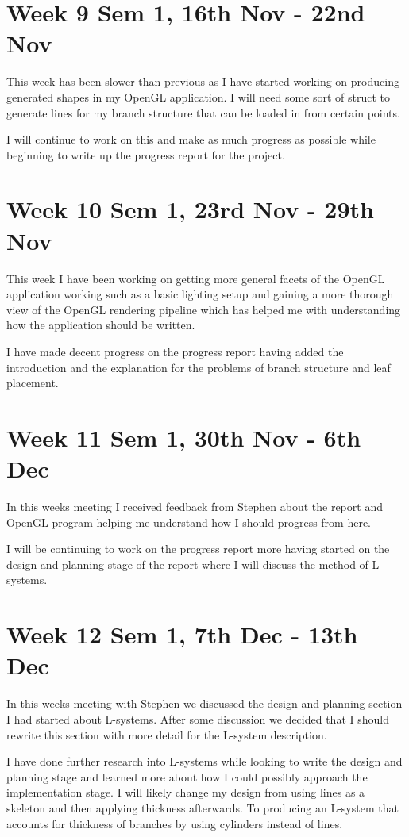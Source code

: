 \documentclass[11pt]{article}
\begin{document}
\section*{Week 9 Sem 1, 16th Nov - 22nd Nov}
This week has been slower than previous as I have started working on producing generated shapes 
in my OpenGL application. I will need some sort of struct to generate lines for my branch 
structure that can be loaded in from certain points. 

I will continue to work on this and make as much progress as possible while beginning to write 
up the progress report for the project.

\section*{Week 10 Sem 1, 23rd Nov - 29th Nov}
This week I have been working on getting more general facets of the OpenGL application working 
such as a basic lighting setup and gaining a more thorough view of the OpenGL rendering 
pipeline which has helped me with understanding how the application should be written.

I have made decent progress on the progress report having added the introduction and the 
explanation for the problems of branch structure and leaf placement.

\section*{Week 11 Sem 1, 30th Nov - 6th Dec}
In this weeks meeting I received feedback from Stephen about the report and OpenGL program 
helping me understand how I should progress from here. 

I will be continuing to work on the progress report more having started on the design and 
planning stage of the report where I will discuss the method of L-systems. 

\section*{Week 12 Sem 1, 7th Dec - 13th Dec}
In this weeks meeting with Stephen we discussed the design and planning section I had started 
about L-systems. After some discussion we decided that I should rewrite this section with more 
detail for the L-system description.

I have done further research into L-systems while looking to write the design and planning stage 
and learned more about how I could possibly approach the implementation stage. I will likely 
change my design from using lines as a skeleton and then applying thickness afterwards. To 
producing an L-system that accounts for thickness of branches by using cylinders instead of lines.
\end{document}
